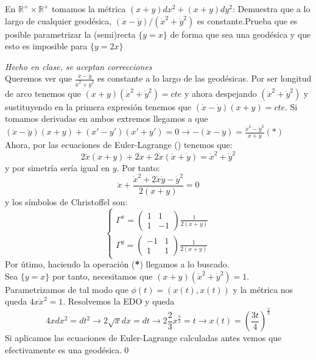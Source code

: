 \begin{problem}[14] En $ℝ^+×ℝ^+$ tomamos la métrica $(x+y)dx^2+(x+y)dy^2$: \ppart Demuestra que a lo largo de cualquier geodésica, $(\dot{x}-\dot{y})/(\dot{x}^2+\dot{y}^2)$ es constante.\ppart Prueba que es posible parametrizar la (semi)recta $\{y=x\}$ de forma que sea una geodésica y que esto es imposible para $\{y=2x\}$
	
	\solution\textit{Hecho en clase, se aceptan correcciones}\\ \spart Queremos ver que $\frac{\dot{x}-\dot{y}}{\dot{x}^2+\dot{y}^2}$ es constante a lo largo de las geodésicas. Por ser longitud de arco tenemos que $(x+y)(\dot{x}^2+\dot{y}^2)=cte$ y ahora despejando $(\dot{x}^2+\dot{y}^2)$ y sustituyendo en la primera expresión tenemos que $(\dot{x}-\dot{y})(x+y)=cte$. Si tomamos derivadas en ambos extremos llegamos a que $(\ddot{x}-\ddot{y})(x+y)+(x'-y')(x'+y')=0\longrightarrow-(\ddot{x}-\ddot{y})=\frac{\dot{x}^2-\dot{y}^2}{x+y}(\textbf{*})$\\
	\indent Ahora, por las ecuaciones de Euler-Lagrange () tenemos que: $$2\ddot{x}(x+y)+2\dot{x}+ 2\dot{x}(\dot{x}+\dot{y})=\dot{x}^2+\dot{y}^2$$ y por simetría sería igual en $y$. Por tanto: $$\ddot{x}+\frac{\dot{x}^2+2\dot{x}\dot{y}-\dot{y}^2}{2(x+y)}=0$$ y los símbolos de Christoffel son: $$\begin{cases}\Gamma^x=\begin{pmatrix}1&1\\1&-1\end{pmatrix}\frac{1}{2(x+y)}\\\Gamma^y=\begin{pmatrix}-1&1\\1&1\end{pmatrix}\frac{1}{2(x+y)}
	\end{cases}$$ Por útimo, haciendo la operación (\textbf{*}) llegamos a lo buscado.\\
	\spart Sea $\{y=x\}$ por tanto, necesitamos que $(x+y)(\dot{x}^2+\dot{y}^2)=1$. Parametrizamos de tal modo que $\phi(t)=(x(t),x(t))$ y la métrica nos queda $4x\dot{x}^2=1$. Resolvemos la EDO y queda $$4xdx^2=dt^2\longrightarrow2\sqrt{x}dx=dt\longrightarrow2\frac{2}{3}x^{\frac{3}{2}}=t\longrightarrow x(t)=\left(\frac{3t}{4}\right)^{\frac{2}{3}}$$ Si aplicamos las ecuaciones de Euler-Lagrange calculadas antes vemos que efectivamente es una geodésica.\qed
\end{problem}
